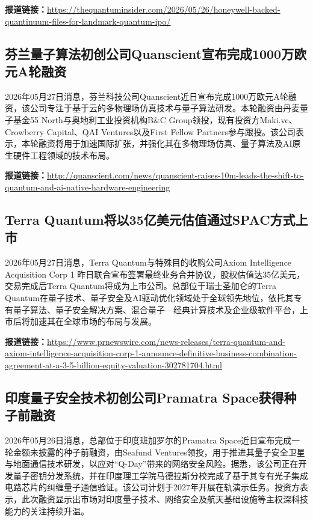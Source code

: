 \documentclass[12pt,a4paper]{ctexart}
\begin{document}
\noindent\textbf{报道链接：}\url{https://thequantuminsider.com/2026/05/26/honeywell-backed-quantinuum-files-for-landmark-quantum-ipo/}

\subsection{ 芬兰量子算法初创公司Quanscient宣布完成1000万欧元A轮融资 }

2026年05月27日消息，芬兰科技公司Quanscient近日宣布完成1000万欧元A轮融资，该公司专注于基于云的多物理场仿真技术与量子算法研发。本轮融资由丹麦量子基金55 North与奥地利工业投资机构B\&C Group领投，现有投资方Maki.vc、Crowberry Capital、QAI Ventures以及First Fellow Partners参与跟投。该公司表示，本轮融资将用于加速国际扩张，并强化其在多物理场仿真、量子算法及AI原生硬件工程领域的技术布局。

\noindent\textbf{报道链接：}\url{http://quanscient.com/news/quanscient-raises-10m-leads-the-shift-to-quantum-and-ai-native-hardware-engineering}

\subsection{ Terra Quantum将以35亿美元估值通过SPAC方式上市 }

2026年05月27日消息，Terra Quantum与特殊目的收购公司Axiom Intelligence Acquisition Corp 1 昨日联合宣布签署最终业务合并协议，股权估值达35亿美元，交易完成后Terra Quantum将成为上市公司。总部位于瑞士圣加仑的Terra Quantum在量子技术、量子安全及AI驱动优化领域处于全球领先地位，依托其专有量子算法、量子安全解决方案、混合量子—经典计算技术及企业级软件平台，上市后将加速其在全球市场的布局与发展。

\noindent\textbf{报道链接：}\url{https://www.prnewswire.com/news-releases/terra-quantum-and-axiom-intelligence-acquisition-corp-1-announce-definitive-business-combination-agreement-at-a-3-5-billion-equity-valuation-302781704.html}

\subsection{ 印度量子安全技术初创公司Pramatra Space获得种子前融资 }

2026年05月26日消息，总部位于印度班加罗尔的Pramatra Space近日宣布完成一轮金额未披露的种子前融资，由Seafund Ventures领投，用于推进其量子安全卫星与地面通信技术研发，以应对“Q-Day”带来的网络安全风险。据悉，该公司正在开发量子密钥分发系统，并在印度理工学院马德拉斯分校完成了基于其专有光子集成电路芯片的纠缠量子通信验证。该公司计划于2027年开展在轨演示任务。投资方表示，此次融资显示出市场对印度量子技术、网络安全及航天基础设施等主权深科技能力的关注持续升温。
\end{document}
